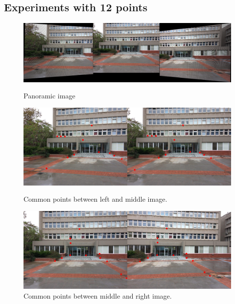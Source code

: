 \documentclass[letterpaper,12pt]{article}
\begin{document}
\subsection{Experiments with 12 points}

\begin{figure}[!htb]
        \centering\includegraphics[width=1\columnwidth]{experiments/12points/finalNonewrong.jpg}
          \caption{
                \label{} Panoramic image
        }
        \centering\includegraphics[width=1\columnwidth]{experiments/12points/left-1_middleNonewrong.jpg}
          \caption{
                \label{} Common points between left and middle image.
        }
        \centering\includegraphics[width=1\columnwidth]{experiments/12points/middle_left-1Nonewrong.jpg}
        \caption{
                \label{} Common points between middle and right image.
        }
\end{figure}
\FloatBarrier
\newpage
\end{document}

